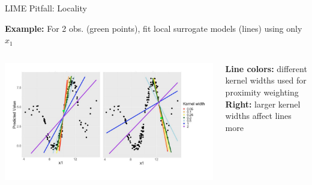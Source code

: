 \documentclass[10pt,compress,t,notes=noshow, xcolor=table]{beamer}
\begin{document}
\begin{frame}{LIME Pitfall: Locality}
\begin{itemize}
     \end{itemize}
     \pause
     \textbf{Example:} For 2 obs. (green points), fit local surrogate models (lines) using only \( x_1 \)
     \begin{columns}[T, totalwidth=\textwidth]
        \begin{column}{0.72\textwidth}
        \includegraphics[width=\textwidth, trim = 25px 0px 15px 40px, clip]{figure/lime_locality}
         \end{column}
         \begin{column}{0.28\textwidth}
    \lz
  \textbf{Line colors:} different kernel widths used for proximity weighting\\
  \lz
  \textbf{Right:} larger kernel widths affect lines more

         \end{column}
     \end{columns}
\end{frame}
\end{document}
